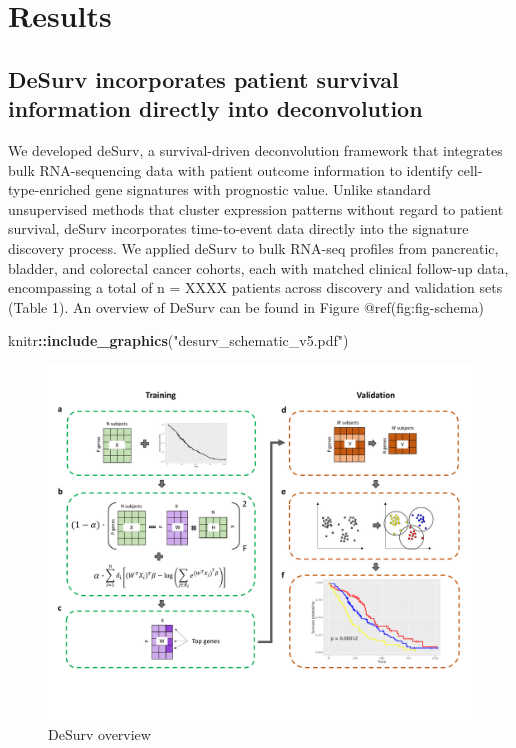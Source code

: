 \documentclass[9pt,twocolumn,twoside,]{pnas-new}
\newenvironment{Shaded}{\begin{snugshade}}{\end{snugshade}}
\newcommand{\FunctionTok}[1]{\textcolor[rgb]{0.13,0.29,0.53}{\textbf{#1}}}
\newcommand{\NormalTok}[1]{#1}
\newcommand{\SpecialCharTok}[1]{\textcolor[rgb]{0.81,0.36,0.00}{\textbf{#1}}}
\newcommand{\StringTok}[1]{\textcolor[rgb]{0.31,0.60,0.02}{#1}}
\begin{document}
\section*{Results}\label{results}

\subsection*{DeSurv incorporates patient survival information directly
into
deconvolution}\label{desurv-incorporates-patient-survival-information-directly-into-deconvolution}

We developed deSurv, a survival-driven deconvolution framework that
integrates bulk RNA-sequencing data with patient outcome information to
identify cell-type-enriched gene signatures with prognostic value.
Unlike standard unsupervised methods that cluster expression patterns
without regard to patient survival, deSurv incorporates time-to-event
data directly into the signature discovery process. We applied deSurv to
bulk RNA-seq profiles from pancreatic, bladder, and colorectal cancer
cohorts, each with matched clinical follow-up data, encompassing a total
of n = XXXX patients across discovery and validation sets (Table 1). An
overview of DeSurv can be found in Figure @ref(fig:fig-schema)

\begin{Shaded}
\begin{Highlighting}[]
\NormalTok{knitr}\SpecialCharTok{::}\FunctionTok{include\_graphics}\NormalTok{(}\StringTok{"desurv\_schematic\_v5.pdf"}\NormalTok{)}
\end{Highlighting}
\end{Shaded}

\begin{figure}
\includegraphics[width=0.8\linewidth]{desurv_schematic_v5} \caption{DeSurv overview}\label{fig:fig-schema}
\end{figure}
\end{document}
